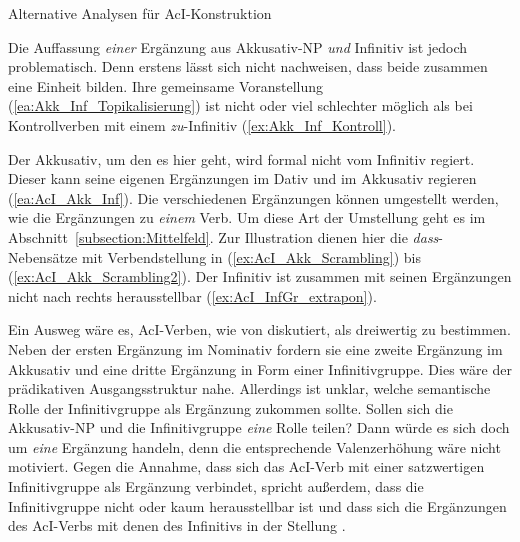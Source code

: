 \newpage
\begin{Exkurs}{Alternative Analysen für AcI-Konstruktion}\label{Exkurs:AcI}

Die Auffassung \textit{einer} Ergänzung aus Akkusativ-NP \textit{und} Infinitiv ist jedoch problematisch. Denn erstens lässt sich nicht nachweisen, dass beide zusammen eine Einheit bilden. Ihre gemeinsame Voranstellung (\ref{ea:Akk_Inf_Topikalisierung}) ist nicht oder viel schlechter möglich als bei Kontrollverben mit einem \textit{zu}-Infinitiv (\ref{ex:Akk_Inf_Kontroll}).

\ea \label{ea:aci_small_clause}
\label{ea:Akk_Inf_Topikalisierung}
\label{ex:Akk_Inf_Kontroll} 
\z 
\z 

Der Akkusativ, um den es hier geht, wird formal nicht vom Infinitiv regiert. Dieser kann seine eigenen Ergänzungen \zB im Dativ und im Akkusativ regieren (\ref{ea:AcI_Akk_Inf}). Die verschiedenen Ergänzungen können umgestellt werden, wie die Ergänzungen zu \textit{einem} Verb. Um diese Art der Umstellung geht es im Abschnitt~\ref{subsection:Mittelfeld}. Zur Illustration dienen hier die \textit{dass}-Nebensätze mit Verbendstellung in (\ref{ex:AcI_Akk_Scrambling}) bis (\ref{ex:AcI_Akk_Scrambling2}). Der Infinitiv ist zusammen mit seinen Ergänzungen nicht nach rechts herausstellbar (\ref{ex:AcI_InfGr_extrapon}).

\ea \label{ea:AcI_Obj_Inf}
\label{ea:AcI_Akk_Inf} 
\label{ex:AcI_Akk_Scrambling} 
\label{ex:AcI_Akk_Scrambling1} 
\label{ex:AcI_Akk_Scrambling2} 
\label{ex:AcI_InfGr_extrapon} 
\z 
\z 

\largerpage[2]
Ein Ausweg wäre es, AcI-Verben, wie von \citet[395--396]{Eisenberg2020_Satz} diskutiert, als dreiwertig zu bestimmen. Neben der ersten Ergänzung im Nominativ fordern sie eine zweite Ergänzung im Akkusativ und eine dritte Ergänzung in Form einer Infinitivgruppe. Dies wäre der prädikativen Ausgangsstruktur nahe. Allerdings ist unklar, welche semantische Rolle der Infinitivgruppe als Ergänzung zukommen sollte. Sollen sich die Akkusativ-NP und die Infinitivgruppe \textit{eine} Rolle teilen? Dann würde es sich doch um \textit{eine} Ergänzung handeln, denn die entsprechende Valenzerhöhung wäre nicht motiviert. Gegen die Annahme, dass sich das AcI-Verb mit einer satzwertigen Infinitivgruppe als Ergänzung verbindet, spricht außerdem, dass die Infinitivgruppe nicht oder kaum herausstellbar ist und dass sich die Ergänzungen des AcI-Verbs mit denen des Infinitivs in der Stellung .

\end{Exkurs}

